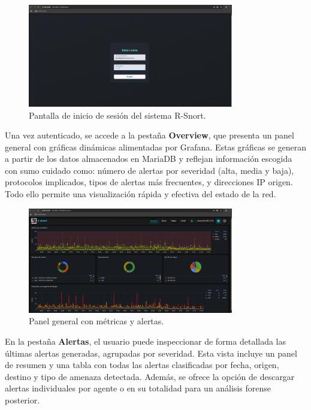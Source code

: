 \documentclass[11pt,a4paper,twoside]{report}
\begin{document}
\begin{figure}[H]
	\centering
	\includegraphics[width=0.8\textwidth]{configuracion/1.png}
	\caption{Pantalla de inicio de sesión del sistema R-Snort.}
	\label{fig:login-rsnort}
\end{figure}

Una vez autenticado, se accede a la pestaña \textbf{Overview}, que presenta un panel general con gráficas dinámicas alimentadas por Grafana. Estas gráficas se generan a partir de los datos almacenados en MariaDB y reflejan información escogida con sumo cuidado como: número de alertas por severidad (alta, media y baja), protocolos implicados, tipos de alertas más frecuentes, y direcciones IP origen. Todo ello permite una visualización rápida y efectiva del estado de la red.

\begin{figure}[H]
	\centering
	\includegraphics[width=0.8\textwidth]{configuracion/2.png}
	\caption{Panel general con métricas y alertas.}
	\label{fig:overview-rsnort}
\end{figure}

\newpage

En la pestaña \textbf{Alertas}, el usuario puede inspeccionar de forma detallada las últimas alertas generadas, agrupadas por severidad. Esta vista incluye un panel de resumen y una tabla con todas las alertas clasificadas por fecha, origen, destino y tipo de amenaza detectada. Además, se ofrece la opción de descargar alertas individuales por agente o en su totalidad para un análisis forense posterior.
\end{document}
